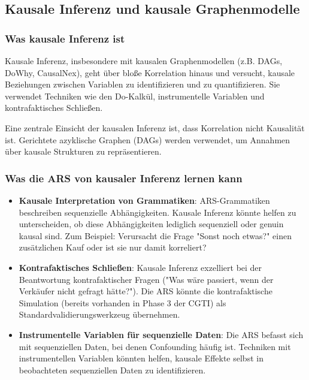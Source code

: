 \documentclass[12pt,a4paper]{article}
\begin{document}
\subsection{Kausale Inferenz und kausale Graphenmodelle}

\subsubsection{Was kausale Inferenz ist}

Kausale Inferenz, insbesondere mit kausalen Graphenmodellen (z.B. DAGs, DoWhy, 
CausalNex), geht über bloße Korrelation hinaus und versucht, kausale Beziehungen 
zwischen Variablen zu identifizieren und zu quantifizieren. Sie verwendet 
Techniken wie den Do-Kalkül, instrumentelle Variablen und kontrafaktisches 
Schließen.

Eine zentrale Einsicht der kausalen Inferenz ist, dass Korrelation nicht 
Kausalität ist. Gerichtete azyklische Graphen (DAGs) werden verwendet, um 
Annahmen über kausale Strukturen zu repräsentieren.

\subsubsection{Was die ARS von kausaler Inferenz lernen kann}

\begin{itemize}
    \item \textbf{Kausale Interpretation von Grammatiken}: ARS-Grammatiken 
    beschreiben sequenzielle Abhängigkeiten. Kausale Inferenz könnte helfen 
    zu unterscheiden, ob diese Abhängigkeiten lediglich sequenziell oder 
    genuin kausal sind. Zum Beispiel: Verursacht die Frage "Sonst noch 
    etwas?" einen zusätzlichen Kauf oder ist sie nur damit korreliert?
    
    \item \textbf{Kontrafaktisches Schließen}: Kausale Inferenz exzelliert 
    bei der Beantwortung kontrafaktischer Fragen ("Was wäre passiert, wenn 
    der Verkäufer nicht gefragt hätte?"). Die ARS könnte die kontrafaktische 
    Simulation (bereits vorhanden in Phase 3 der CGTI) als Standardvalidierungswerkzeug 
    übernehmen.
    
    \item \textbf{Instrumentelle Variablen für sequenzielle Daten}: Die ARS 
    befasst sich mit sequenziellen Daten, bei denen Confounding häufig ist. 
    Techniken mit instrumentellen Variablen könnten helfen, kausale Effekte 
    selbst in beobachteten sequenziellen Daten zu identifizieren.
\end{itemize}
\end{document}

